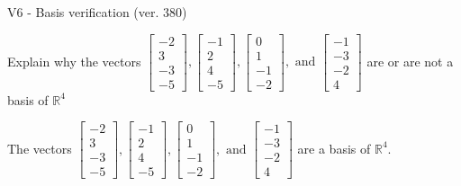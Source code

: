 \begin{exercise}
  \begin{exerciseTitle}V6 - Basis verification (ver. 380)\end{exerciseTitle}
  \begin{exerciseStatement}
    Explain why the vectors \(\left[\begin{array}{r}
-2 \\
3 \\
-3 \\
-5
\end{array}\right] , \left[\begin{array}{r}
-1 \\
2 \\
4 \\
-5
\end{array}\right] , \left[\begin{array}{r}
0 \\
1 \\
-1 \\
-2
\end{array}\right] , \text{ and } \left[\begin{array}{r}
-1 \\
-3 \\
-2 \\
4
\end{array}\right]\) are or are not a basis of \(\mathbb{R}^4\)	


  \end{exerciseStatement}
  \begin{exerciseAnswer}
   The vectors \(\left[\begin{array}{r}
-2 \\
3 \\
-3 \\
-5
\end{array}\right] , \left[\begin{array}{r}
-1 \\
2 \\
4 \\
-5
\end{array}\right] , \left[\begin{array}{r}
0 \\
1 \\
-1 \\
-2
\end{array}\right] , \text{ and } \left[\begin{array}{r}
-1 \\
-3 \\
-2 \\
4
\end{array}\right]\) 
  	 are  a basis of \(\mathbb{R}^4\).
  


  \end{exerciseAnswer}
\end{exercise}